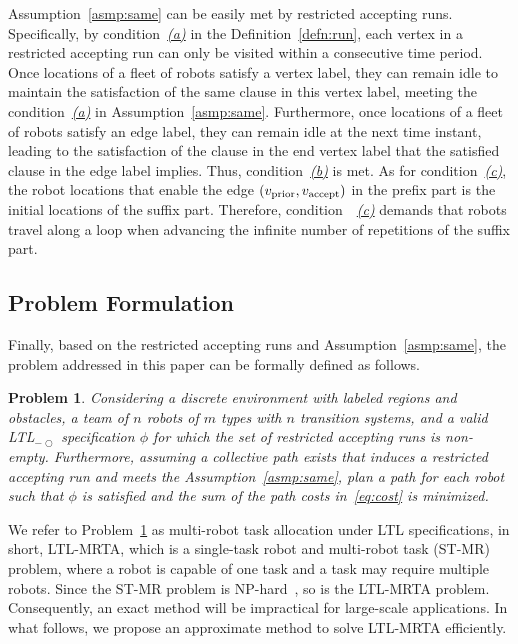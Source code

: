 \documentclass[Afour,sageh,times]{sagej}
\newtheorem{problem}{Problem}
\newcommand{\ltl}{ {\it LTL}$_{-\bigcirc}$ }
\newcommand{\vertex}[1]{v_{\textup{#1}}}
\begin{document}
Assumption~\ref{asmp:same} can be easily met by restricted accepting runs. Specifically, by condition~\hyperref[cond:a]{\it (a)} in the Definition~\ref{defn:run}, each vertex in a restricted accepting run can only be visited within a consecutive time period.  Once locations of a fleet of robots satisfy a  vertex label, they can remain idle to maintain the satisfaction of the same clause in this vertex label, meeting the condition~\hyperref[asmp:a]{\it (a)} in Assumption~\ref{asmp:same}. Furthermore, once locations of a fleet of  robots satisfy an edge label, they can remain idle at the next time instant, leading to the satisfaction of the clause in the end vertex label that the satisfied clause in the edge label implies. Thus, condition~\hyperref[asmp:b]{\it (b)} is  met. As for condition~\hyperref[asmp:c]{\it (c)}, the robot locations that enable the edge $(\vertex{prior}, \vertex{accept})$ in the prefix part is the initial locations of the suffix part. Therefore, condition~~\hyperref[asmp:c]{\it (c)} demands that robots travel along a loop when advancing the infinite number of repetitions of the suffix part.
\subsection{Problem Formulation}\label{sec:formulation}
Finally, based on the restricted accepting runs and Assumption~\ref{asmp:same}, the problem addressed in this paper can be formally defined as follows.

\begin{problem}\label{prob:1}
Considering  a discrete environment with labeled regions and obstacles, a team of $n$ robots of $m$ types with $n$ transition systems, and a valid \ltl specification $\phi$ for which the set of restricted accepting runs is non-empty. Furthermore, assuming a collective path  exists that induces a restricted  accepting run  and meets the Assumption~\ref{asmp:same}, plan a path for each robot such that $\phi$ is satisfied and the sum of the path costs in~\eqref{eq:cost} is minimized.
\end{problem}

We refer to Problem~\ref{prob:1} as multi-robot task allocation under LTL specifications, in short, LTL-MRTA, which is a single-task robot and multi-robot task (ST-MR) problem, where a robot is capable of one task and a task may require multiple robots. Since the ST-MR problem is NP-hard~\cite{korsah2013comprehensive,nunes2017taxonomy}, so is the LTL-MRTA problem. Consequently, an exact method will be impractical for large-scale applications. In what follows, we propose an approximate method to solve LTL-MRTA efficiently.
\end{document}
